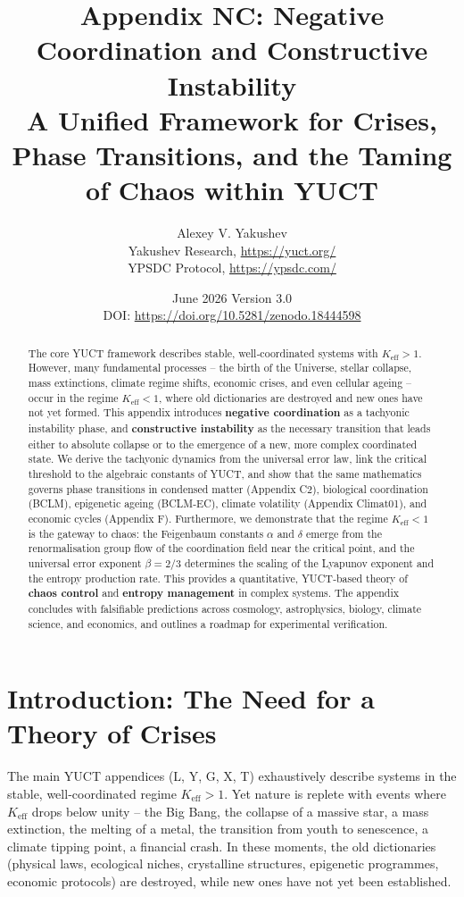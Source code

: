 \documentclass[12pt,a4paper]{article}
\title{\Huge\textbf{Appendix NC: Negative Coordination and Constructive Instability}\\[0.3cm]
	\Large A Unified Framework for Crises, Phase Transitions, and the Taming of Chaos within YUCT}
\author{Alexey V. Yakushev \\ 
	Yakushev Research, \url{https://yuct.org/} \\ 
	YPSDC Protocol, \url{https://ypsdc.com/}}
\date{June 2026 \quad Version 3.0 \\ \medskip
	DOI: \url{https://doi.org/10.5281/zenodo.18444598}}
\newcommand{\Keff}{K_{\mathrm{eff}}}
\begin{document}
	
	\maketitle
	
	\begin{abstract}
		The core YUCT framework describes stable, well‑coordinated systems with $\Keff > 1$.
		However, many fundamental processes – the birth of the Universe, stellar collapse,
		mass extinctions, climate regime shifts, economic crises, and even cellular ageing –
		occur in the regime $\Keff < 1$, where old dictionaries are destroyed and new ones
		have not yet formed. This appendix introduces \textbf{negative coordination} as a
		tachyonic instability phase, and \textbf{constructive instability} as the necessary
		transition that leads either to absolute collapse or to the emergence of a new,
		more complex coordinated state. We derive the tachyonic dynamics from the universal
		error law, link the critical threshold to the algebraic constants of YUCT, and show
		that the same mathematics governs phase transitions in condensed matter (Appendix C2),
		biological coordination (BCLM), epigenetic ageing (BCLM‑EC), climate volatility
		(Appendix Climat01), and economic cycles (Appendix F). Furthermore, we demonstrate
		that the regime $\Keff < 1$ is the gateway to chaos: the Feigenbaum constants
		$\alpha$ and $\delta$ emerge from the renormalisation group flow of the coordination
		field near the critical point, and the universal error exponent $\beta = 2/3$
		determines the scaling of the Lyapunov exponent and the entropy production rate.
		This provides a quantitative, YUCT‑based theory of \textbf{chaos control} and
		\textbf{entropy management} in complex systems. The appendix concludes with
		falsifiable predictions across cosmology, astrophysics, biology, climate science,
		and economics, and outlines a roadmap for experimental verification.
	\end{abstract}
	
	\tableofcontents
	\newpage
	
	\section{Introduction: The Need for a Theory of Crises}
	
	The main YUCT appendices (L, Y, G, X, T) exhaustively describe systems in the stable,
	well‑coordinated regime $\Keff > 1$. Yet nature is replete with events where
	$\Keff$ drops below unity – the Big Bang, the collapse of a massive star, a mass
	extinction, the melting of a metal, the transition from youth to senescence, a
	climate tipping point, a financial crash. In these moments, the old dictionaries
	(physical laws, ecological niches, crystalline structures, epigenetic programmes,
	economic protocols) are destroyed, while new ones have not yet been established.
	
\end{document}
